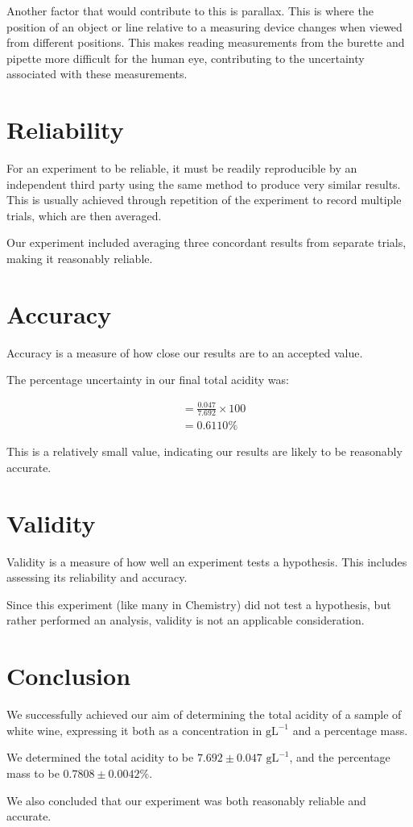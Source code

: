 \documentclass[a4paper,11pt]{article}
\begin{document}
Another factor that would contribute to this is parallax. This is where the position of
an object or line relative to a measuring device changes when viewed from
different positions. This makes reading measurements from the burette and
pipette more difficult for the human eye, contributing to the uncertainty
associated with these measurements.


\section{Reliability}

For an experiment to be reliable, it must be readily reproducible by an
independent third party using the same method to produce very similar
results. This is usually achieved through repetition of the experiment to
record multiple trials, which are then averaged.

Our experiment included averaging three concordant results from separate
trials, making it reasonably reliable.


\section{Accuracy}

Accuracy is a measure of how close our results are to an accepted value.

The percentage uncertainty in our final total acidity was:

$$
\begin{aligned}
& = \frac{0.047}{7.692} \times 100 \\
& = 0.6110\%
\end{aligned}
$$

This is a relatively small value, indicating our results are likely to be
reasonably accurate.


\section{Validity}

Validity is a measure of how well an experiment tests a hypothesis. This includes
assessing its reliability and accuracy.

Since this experiment (like many in Chemistry) did not test a hypothesis, but
rather performed an analysis, validity is not an applicable consideration.


\section{Conclusion}

We successfully achieved our aim of determining the total acidity of a sample
of white wine, expressing it both as a concentration in $\mbox{gL}^{-1}$ and
a percentage mass.

We determined the total acidity to be $7.692 \pm 0.047\mbox{ gL}^{-1}$, and
the percentage mass to be $0.7808 \pm 0.0042\%$.

We also concluded that our experiment was both reasonably reliable and
accurate.
\end{document}

